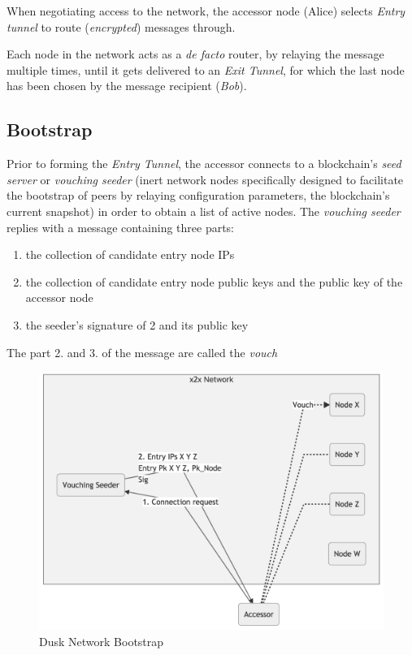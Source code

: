 When negotiating access to the network, the accessor node (Alice)
selects \emph{Entry tunnel} to route (\emph{encrypted}) messages
through.

Each node in the network acts as a \emph{de facto} router, by relaying
the message multiple times, until it gets delivered to an \emph{Exit
Tunnel}, for which the last node has been chosen by the message
recipient (\emph{Bob}).

\subsection{Bootstrap}

Prior to forming the \emph{Entry Tunnel}, the accessor connects to a
blockchain's \emph{seed server} or \emph{vouching seeder} (inert network
nodes specifically designed to facilitate the bootstrap of peers by
relaying configuration parameters, the blockchain's current snapshot) in
order to obtain a list of active nodes. The \emph{vouching seeder}
replies with a message containing three parts:

\begin{enumerate}
\def\labelenumi{\arabic{enumi}.}
\item
  the collection of candidate entry node IPs
\item
  the collection of candidate entry node public keys and the public key
  of the accessor node
\item
  the seeder's signature of 2 and its public key
\end{enumerate}

The part 2. and 3. of the message are called the \emph{vouch}\\

\begin{figure}
\includegraphics[scale=0.18]{bootstrap}
\caption{\textrm{Dusk} Network Bootstrap}
\label{boot}
\end{figure}

